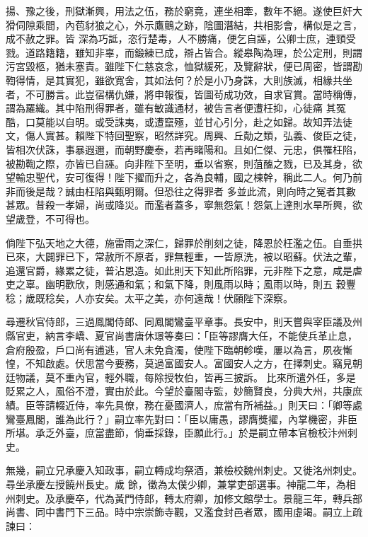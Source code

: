 \begin{pinyinscope}
 揚、豫之後，刑獄漸興，用法之伍，務於窮竟，連坐相牽，數年不絕。遂使巨奸大猾伺隙乘間，內苞豺狼之心，外示鷹鸇之跡，陰圖潛結，共相影會，構似是之言，成不赦之罪。皆
 深為巧詆，恣行楚毒，人不勝痛，便乞自誣，公卿士庶，連頸受戮。道路籍籍，雖知非辜，而鍛練已成，辯占皆合。縱皋陶為理，於公定刑，則謂污宮毀柩，猶未塞責。雖陛下仁慈哀念，恤獄緩死，及覽辭狀，便已周密，皆謂勘鞫得情，是其實犯，雖欲寬舍，其如法何？於是小乃身誅，大則族滅，相緣共坐者，不可勝言。此豈宿構仇嫌，將申報復，皆圖茍成功效，自求官賞。當時稱傳，謂為羅織。其中陷刑得罪者，雖有敏識通材，被告言者便遭枉抑，心徒痛
 其冤酷，口莫能以自明。或受誅夷，或遭竄殛，並甘心引分，赴之如歸。故知弄法徒文，傷人實甚。賴陛下特回聖察，昭然詳究。周興、丘勣之類，弘義、俊臣之徒，皆相次伏誅，事暴遐邇，而朝野慶泰，若再睹陽和。且如仁傑、元忠，俱罹枉陷，被勘鞫之際，亦皆已自誣。向非陛下至明，垂以省察，則菹醢之戮，已及其身，欲望輸忠聖代，安可復得！陛下擢而升之，各為良輔，國之棟幹，稱此二人。何乃前非而後是哉？誠由枉陷與甄明爾。但恐往之得罪者
 多並此流，則向時之冤者其數甚眾。昔殺一孝婦，尚或降災。而濫者蓋多，寧無怨氣！怨氣上達則水旱所興，欲望歲登，不可得也。



 倘陛下弘天地之大德，施雷雨之深仁，歸罪於削刻之徒，降恩於枉濫之伍。自垂拱已來，大闢罪已下，常赦所不原者，罪無輕重，一皆原洗，被以昭蘇。伏法之輩，追還官爵，緣累之徒，普沾恩造。如此則天下知此所陷罪，元非陛下之意，咸是虐吏之辜。幽明歡欣，則感通和氣；和氣下降，則風雨以時；風雨以時，則五
 穀豐稔；歲既稔矣，人亦安矣。太平之美，亦何遠哉！伏願陛下深察。



 尋遷秋官侍郎，三過鳳閣侍郎、同鳳閣鸞臺平章事。長安中，則天嘗與宰臣議及州縣官吏，納言李嶠、夏官尚書唐休璟等奏曰：「臣等謬膺大任，不能使兵革止息，倉府殷盈，戶口尚有逋逃，官人未免貪濁，使陛下臨朝軫嘆，屢以為言，夙夜慚惶，不知啟處。伏思當今要務，莫過富國安人。富國安人之方，在擇刺史。竊見朝廷物議，莫不重內官，輕外職，每除授牧伯，皆再三披訴。
 比來所遣外任，多是貶累之人，風俗不澄，實由於此。今望於臺閣寺監，妙簡賢良，分典大州，共康庶績。臣等請輟近侍，率先具僚，務在憂國濟人，庶當有所補益。」則天曰：「卿等處鸞臺鳳閣，誰為此行？」嗣立率先對曰：「臣以庸愚，謬膺獎擢，內掌機密，非臣所堪。承乏外臺，庶當盡節，倘垂採錄，臣願此行。」於是嗣立帶本官檢校汴州刺史。



 無幾，嗣立兄承慶入知政事，嗣立轉成均祭酒，兼檢校魏州刺史。又徙洺州刺史。尋坐承慶左授饒州長史。歲
 餘，徵為太僕少卿，兼掌吏部選事。神龍二年，為相州刺史。及承慶卒，代為黃門侍郎，轉太府卿，加修文館學士。景龍三年，轉兵部尚書、同中書門下三品。時中宗崇飾寺觀，又濫食封邑者眾，國用虛竭。嗣立上疏諫曰：




\end{pinyinscope}
